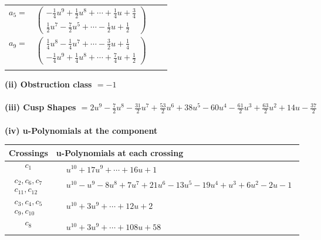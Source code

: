 \documentclass[1p]{elsarticle_modified}
\theoremstyle{definition}
\begin{document}
\begin{tabular}{m{7pt} m{180pt} m{7pt} m{180pt} }
\flushright $a_{5}=$&$\begin{pmatrix}-\frac{1}{4} u^9+\frac{1}{2} u^8+\cdots+\frac{1}{4} u+\frac{3}{4}\\\frac{1}{2} u^7-\frac{7}{2} u^5+\cdots-\frac{1}{2} u+\frac{1}{2}\end{pmatrix}$ \\
\flushright $a_{9}=$&$\begin{pmatrix}\frac{1}{4} u^8-\frac{1}{4} u^7+\cdots-\frac{3}{2} u+\frac{1}{4}\\-\frac{1}{4} u^9+\frac{1}{4} u^8+\cdots+\frac{7}{4} u+\frac{1}{2}\end{pmatrix}$\\&\end{tabular}
\flushleft \textbf{(ii) Obstruction class $= -1$}\\~\\
\flushleft \textbf{(iii) Cusp Shapes $= 2 u^9-\frac{7}{2} u^8-\frac{31}{2} u^7+\frac{53}{2} u^6+38 u^5-60 u^4-\frac{61}{2} u^3+\frac{63}{2} u^2+14 u-\frac{37}{2}$}\\~\\
\newpage\renewcommand{\arraystretch}{1}
\flushleft \textbf{(iv) u-Polynomials at the component}\newline \\
\begin{tabular}{m{50pt}|m{274pt}}
Crossings & \hspace{64pt}u-Polynomials at each crossing \\
\hline $$\begin{aligned}c_{1}\end{aligned}$$&$\begin{aligned}
&u^{10}+17 u^9+\cdots+16 u+1
\end{aligned}$\\
\hline $$\begin{aligned}c_{2},c_{6},c_{7}\\c_{11},c_{12}\end{aligned}$$&$\begin{aligned}
&u^{10}- u^9-8 u^8+7 u^7+21 u^6-13 u^5-19 u^4+u^3+6 u^2-2 u-1
\end{aligned}$\\
\hline $$\begin{aligned}c_{3},c_{4},c_{5}\\c_{9},c_{10}\end{aligned}$$&$\begin{aligned}
&u^{10}+3 u^9+\cdots+12 u+2
\end{aligned}$\\
\hline $$\begin{aligned}c_{8}\end{aligned}$$&$\begin{aligned}
&u^{10}+3 u^9+\cdots+108 u+58
\end{aligned}$\\
\hline
\end{tabular}\\~\\
\end{document}
